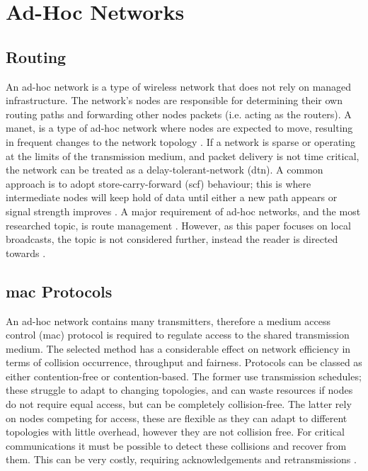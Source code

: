 \section{Ad-Hoc Networks}\label{sec:adhocnetworks}
\subsection{Routing}
An ad-hoc network is a type of wireless network that does not rely on managed infrastructure. The network's nodes are responsible for determining their own routing paths and forwarding other nodes packets (i.e. acting as the routers).  A \ac{manet}, is a type of ad-hoc network where nodes are expected to move, resulting in frequent changes to the network topology \cite{3YP:MANET_RFC2501}. If a network is sparse or operating at the limits of the transmission medium, and packet delivery is not time critical, the network can be treated as a delay-tolerant-network (\ac{dtn}). A common approach is to adopt store-carry-forward (\ac{scf}) behaviour; this is where intermediate nodes will keep hold of data until either a new path appears or signal strength improves \cite{3YP:DTNS}. A major requirement of ad-hoc networks, and the most researched  topic, is route management \cite{3YP:MANET_RESEARCH_TRENDS}. However, as this paper focuses on local broadcasts, the topic is not considered further, instead the reader is directed towards \cite{3YP:ROUTING_ALGORITHMS}.  

\subsection{\ac{mac} Protocols}
\label{sec:mac_protocol_background}
An ad-hoc network contains many transmitters, therefore a medium access control (\ac{mac}) protocol is required to regulate access to the shared transmission medium. The selected method has a considerable effect on network efficiency in terms of collision occurrence, throughput and fairness. Protocols can be classed as either contention-free or contention-based. The former use transmission schedules; these struggle to adapt to changing topologies, and can waste resources if nodes do not require equal access, but can be completely collision-free. The latter rely on nodes competing for access, these are flexible as they can adapt to different topologies with little overhead, however they are not collision free. For critical communications it must be possible to detect these collisions and recover from them. This can be very costly, requiring acknowledgements and retransmissions \cite{3YP:WSN_BOOK}.

